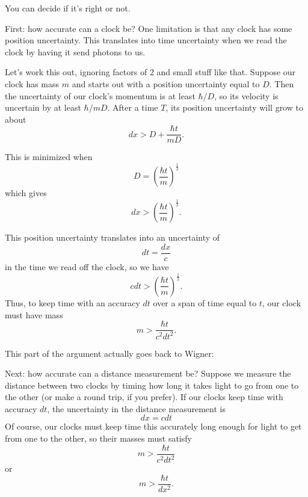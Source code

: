 \documentclass{article}
\renewcommand{\texttt}[1]{%
  \begingroup
  \ttfamily
  \begingroup\lccode`~=`/\lowercase{\endgroup\def~}{/\discretionary{}{}{}}%
  \begingroup\lccode`~=`[\lowercase{\endgroup\def~}{[\discretionary{}{}{}}%
  \begingroup\lccode`~=`.\lowercase{\endgroup\def~}{.\discretionary{}{}{}}%
  \catcode`/=\active\catcode`[=\active\catcode`.=\active
  \scantokens{#1\noexpand}%
  \endgroup
}
\begin{document}
You can decide if it's right or not.

First: how accurate can a clock be? One limitation is that any clock has
some position uncertainty. This translates into time uncertainty when we
read the clock by having it send photons to us.

Let's work this out, ignoring factors of \(2\) and small stuff like
that. Suppose our clock has mass \(m\) and starts out with a position
uncertainty equal to \(D\). Then the uncertainty of our clock's momentum
is at least \(\hbar/D\), so its velocity is uncertain by at least
\(\hbar/mD\). After a time \(T\), its position uncertainty will grow to
about \[dx > D + \frac{\hbar t}{mD}.\]

This is minimized when \[D = \left(\frac{\hbar t}{m}\right)^{\frac12}\]
which gives \[dx > \left(\frac{\hbar t}{m}\right)^{\frac12}.\]

This position uncertainty translates into an uncertainty of
\[dt = \frac{dx}{c}\] in the time we read off the clock, so we have
\[c dt > \left(\frac{\hbar t}{m}\right)^{\frac12}.\] Thus, to keep time
with an accuracy \(dt\) over a span of time equal to \(t\), our clock
must have mass \[m > \frac{\hbar t}{c^2 dt^2}.\]

This part of the argument actually goes back to Wigner:


Next: how accurate can a distance measurement be? Suppose we measure the
distance between two clocks by timing how long it takes light to go from
one to the other (or make a round trip, if you prefer). If our clocks
keep time with accuracy \(dt\), the uncertainty in the distance
measurement is \[dx = c dt\] Of course, our clocks must keep time this
accurately long enough for light to get from one to the other, so their
masses must satisfy \[m > \frac{\hbar t}{c^2 dt^2}\] or
\[m > \frac{\hbar t}{dx^2}.\]
\end{document}
